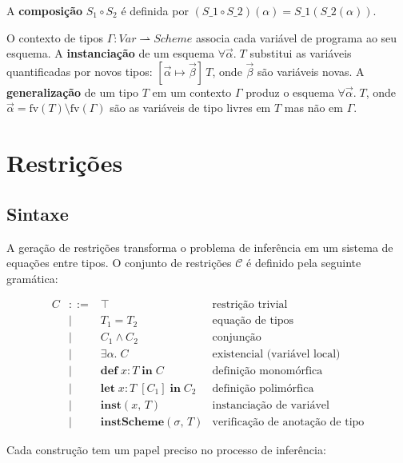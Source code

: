   A \textbf{composição} \(S_1 \circ S_2\) é definida por
  \((S\_1 \circ S\_2)(\alpha) = S\_1(S\_2(\alpha))\).

  O contexto de tipos \(\Gamma : \mathit{Var} \rightharpoonup
  \mathit{Scheme}\) associa cada variável de programa ao seu esquema.
  A \textbf{instanciação} de um esquema \(\forall
  \vec{\alpha}.\; T\) substitui as variáveis
  quantificadas por novos tipos: \([\vec{\alpha} \mapsto
  \vec{\beta}]\, T\), onde \(\vec{\beta}\) são variáveis novas. A
  \textbf{generalização} de um tipo \(T\) em um contexto \(\Gamma\)
  produz o esquema \(\forall \vec{\alpha}.\; T\), onde \(\vec{\alpha} =
  \mathrm{fv}(T) \setminus \mathrm{fv}(\Gamma)\) são as variáveis de
  tipo livres em \(T\) mas não em \(\Gamma\).

  \section{Restrições}

  \subsection{Sintaxe}

  A geração de restrições transforma o problema de inferência em um
  sistema de equações entre tipos. O conjunto de restrições
  \(\mathcal{C}\) é definido pela seguinte gramática:

  \[
    \begin{array}{rcll} C & ::= & \top & \text{restrição trivial} \\ & | & T_1
      = T_2 & \text{equação de tipos} \\ & | & C_1 \wedge C_2 & \text{conjunção}
      \\ & | & \exists \alpha.\; C & \text{existencial (variável
      local)} \\ & | &
      \mathbf{def}\; x : T\; \mathbf{in}\; C & \text{definição
      monomórfica} \\ & | &
      \mathbf{let}\; x : T\; [C_1]\; \mathbf{in}\; C_2 & \text{definição
      polimórfica}
      \\ & | & \mathbf{inst}(x,\, T) & \text{instanciação de variável} \\ & | &
      \mathbf{instScheme}(\sigma,\, T) & \text{verificação de anotação de tipo}
    \end{array}
  \]

  Cada construção tem um papel preciso no processo de inferência:

